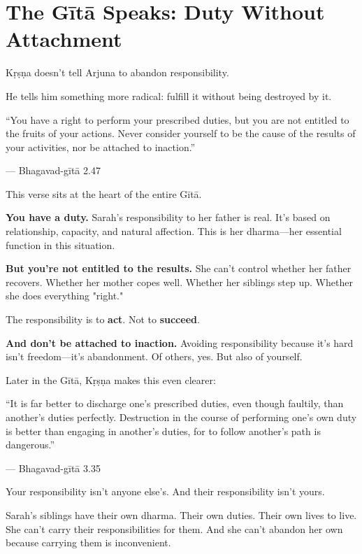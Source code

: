 \documentclass[11pt,twoside]{book}
\begin{document}
\section*{The Gītā Speaks: Duty Without Attachment}

Kṛṣṇa doesn't tell Arjuna to abandon responsibility.

He tells him something more radical: fulfill it without being destroyed by it.

\begin{pullquote}
``You have a right to perform your prescribed duties, but you are not entitled to the fruits of your actions. Never consider yourself to be the cause of the results of your activities, nor be attached to inaction.''

--- Bhagavad-gītā 2.47
\end{pullquote}

This verse sits at the heart of the entire Gītā.

\textbf{\textbf{You have a duty.}} Sarah's responsibility to her father is real. It's based on relationship, capacity, and natural affection. This is her dharma—her essential function in this situation.

\textbf{\textbf{But you're not entitled to the results.}} She can't control whether her father recovers. Whether her mother copes well. Whether her siblings step up. Whether she does everything "right."

The responsibility is to \textbf{act}. Not to \textbf{succeed}.

\textbf{\textbf{And don't be attached to inaction.}} Avoiding responsibility because it's hard isn't freedom—it's abandonment. Of others, yes. But also of yourself.

Later in the Gītā, Kṛṣṇa makes this even clearer:

\begin{pullquote}
``It is far better to discharge one's prescribed duties, even though faultily, than another's duties perfectly. Destruction in the course of performing one's own duty is better than engaging in another's duties, for to follow another's path is dangerous.''

--- Bhagavad-gītā 3.35
\end{pullquote}

Your responsibility isn't anyone else's. And their responsibility isn't yours.

Sarah's siblings have their own dharma. Their own duties. Their own lives to live. She can't carry their responsibilities for them. And she can't abandon her own because carrying them is inconvenient.
\end{document}
